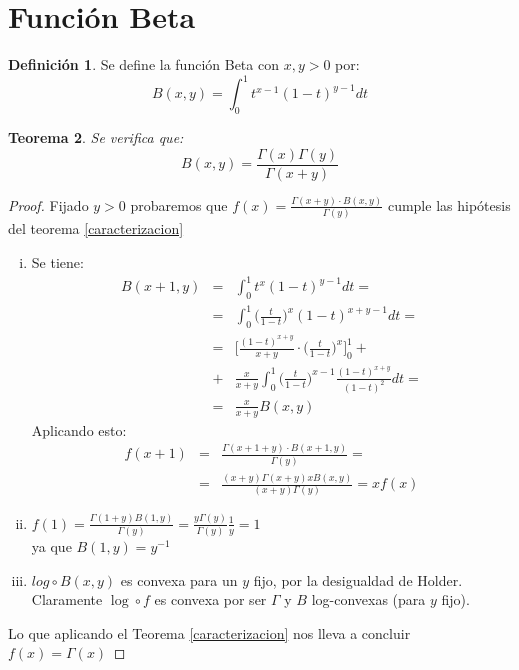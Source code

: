 \documentclass[a4paper, 11pt]{amsart}
\newtheorem{theorem}{Teorema}[section]
\theoremstyle{definition}
\newtheorem{definition}[theorem]{Definición}
\theoremstyle{remark}
\numberwithin{equation}{section}
\begin{document}
  \section{Función Beta}
  
  \begin{definition}
   Se define la función Beta con $x,y>0$ por:
   \begin{equation}
       B(x,y) = \int_0^1 {t^{x-1}(1-t)^{y-1}dt}
       \label{beta}
   \end{equation}
  \end{definition}

  
  \begin{theorem}
   Se verifica que:
    $$B(x,y) = \frac{\Gamma(x)\Gamma(y)}{\Gamma(x+y)}$$
   \end{theorem}
   
   \begin{proof}
    Fijado $y>0$ probaremos que $f(x) = \frac{\Gamma(x+y)\cdot B(x,y)}{\Gamma(y)}$ cumple las hipótesis del
    teorema \ref{caracterizacion}
    
    \begin{enumerate}[i.]
     \item Se tiene:
      \begin{eqnarray}
       B(x+1,y) &=& \int_0^1{t^x (1-t)^{y-1}dt} =\\ 	\nonumber
		&=& \int_0^1{\bigg(\frac{t}{1-t}\bigg)^x (1-t)^{x+y-1} dt} =\\	\nonumber
		&=& \bigg[\frac{(1-t)^{x+y}}{x+y}\cdot \bigg(\frac{t}{1-t}\bigg)^x\bigg]_0^1 +\\\nonumber
		&+& \frac{x}{x+y} \int_0^1{ \bigg(\frac{t}{1-t}\bigg)^{x-1} \frac{(1-t)^{x+y}}{(1-t)^2}dt}=\\		\nonumber       
		&=& \frac{x}{x+y}B(x,y)
      \end{eqnarray}
      Aplicando esto:
      \begin{eqnarray*}
      f(x+1) &=& \frac{\Gamma(x+1+y)\cdot B(x+1,y)}{\Gamma(y)} = \\
	     &=& \frac{(x+y)\Gamma(x+y)xB(x,y)}{(x+y)\Gamma(y)} = xf(x)
      \end{eqnarray*}
      
    \item $f(1) = \frac{\Gamma(1+y)B(1,y)}{\Gamma(y)} = \frac{y\Gamma(y)}{\Gamma(y)}\frac{1}{y} = 1$\\
    
      ya que $B(1,y) = y^{-1}$\\
      
    \item $log\circ B(x,y)$ es convexa para un $y$ fijo, por la desigualdad de Holder.\\
      Claramente $\log \circ f$ es convexa por ser $\Gamma$ y $B$ log-convexas (para $y$ fijo).
      
    \end{enumerate}
    \bigskip
    Lo que aplicando el Teorema \ref{caracterizacion} nos lleva a concluir $f(x) = \Gamma(x)$
   \end{proof}
   
\end{document}
